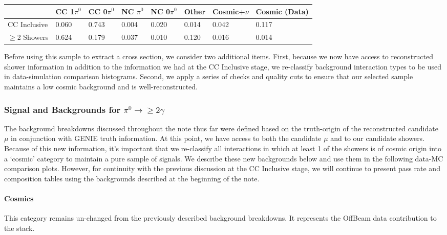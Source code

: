 \begin{table}[H]
\centering
{}
 \begin{tabular}{| l | l | l |l|l|l|l|l|}
 \hline
 & CC 1$\pi^0$ & CC 0$\pi^0$ & NC $\pi^0$ & NC 0$\pi^0$ & Other &Cosmic+$\nu$& Cosmic (Data) \\ [0.1ex] \hline
CC Inclusive & 0.060 & 0.743 & 0.004 & 0.020 & 0.014 & 0.042 & 0.117 \\
$\geq$2 Showers & 0.624 & 0.179 & 0.037 & 0.010 & 0.120 & 0.016 & 0.014\\ \hline
\end{tabular}
\end{table}

Before using this sample to extract a cross section, we consider two additional items. First, because we now have access to reconstructed shower information in addition to the information we had at the CC Inclusive stage, we re-classify background interaction types to be used in data-simulation comparison histograms. Second, we apply a series of checks and quality cuts to ensure that our selected sample maintains a low cosmic background and is well-reconstructed.

\subsubsection{Signal and Backgrounds for $\pi^0\rightarrow\geq 2 \gamma$}
The background breakdowns discussed throughout the note thus far were defined based on the truth-origin of the reconstructed candidate $\mu$ in conjunction with GENIE truth information. At this point, we have access to both the candidate $\mu$ and to our candidate showers.  Because of this new information, it's important that we re-classify all interactions in which at least 1 of the showers is of cosmic origin into a `cosmic' category to maintain a pure sample of signals. We describe these new backgrounds below and use them in the following data-MC comparison plots. However, for continuity with the previous discussion at the CC Inclusive stage, we will continue to present pass rate and composition tables using the backgrounds described at the beginning of the note. 

\paragraph{ Cosmics}
This category remains un-changed from the previously described background breakdowns.  It represents the OffBeam data contribution to the stack. 

